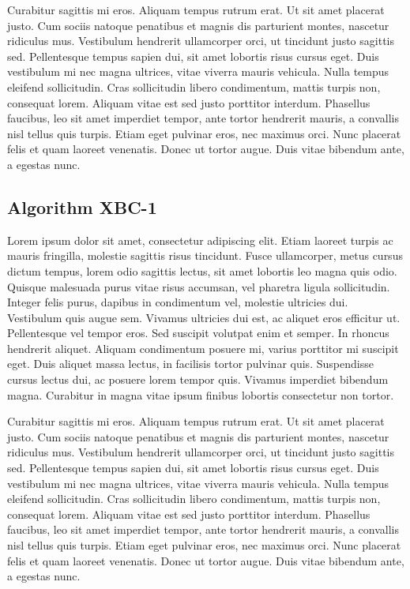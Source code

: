 \documentclass[conference]{IEEEtran}
\begin{document}
Curabitur sagittis mi eros. Aliquam tempus rutrum erat. Ut sit amet placerat justo. Cum sociis natoque penatibus et magnis dis parturient montes, nascetur ridiculus mus. Vestibulum hendrerit ullamcorper orci, ut tincidunt justo sagittis sed. Pellentesque tempus sapien dui, sit amet lobortis risus cursus eget. Duis vestibulum mi nec magna ultrices, vitae viverra mauris vehicula. Nulla tempus eleifend sollicitudin. Cras sollicitudin libero condimentum, mattis turpis non, consequat lorem. Aliquam vitae est sed justo porttitor interdum. Phasellus faucibus, leo sit amet imperdiet tempor, ante tortor hendrerit mauris, a convallis nisl tellus quis turpis. Etiam eget pulvinar eros, nec maximus orci. Nunc placerat felis et quam laoreet venenatis. Donec ut tortor augue. Duis vitae bibendum ante, a egestas nunc.

\subsection{Algorithm XBC-1}

Lorem ipsum dolor sit amet, consectetur adipiscing elit. Etiam laoreet turpis ac mauris fringilla, molestie sagittis risus tincidunt. Fusce ullamcorper, metus cursus dictum tempus, lorem odio sagittis lectus, sit amet lobortis leo magna quis odio. Quisque malesuada purus vitae risus accumsan, vel pharetra ligula sollicitudin. Integer felis purus, dapibus in condimentum vel, molestie ultricies dui. Vestibulum quis augue sem. Vivamus ultricies dui est, ac aliquet eros efficitur ut. Pellentesque vel tempor eros. Sed suscipit volutpat enim et semper. In rhoncus hendrerit aliquet. Aliquam condimentum posuere mi, varius porttitor mi suscipit eget. Duis aliquet massa lectus, in facilisis tortor pulvinar quis. Suspendisse cursus lectus dui, ac posuere lorem tempor quis. Vivamus imperdiet bibendum magna. Curabitur in magna vitae ipsum finibus lobortis consectetur non tortor.

Curabitur sagittis mi eros. Aliquam tempus rutrum erat. Ut sit amet placerat justo. Cum sociis natoque penatibus et magnis dis parturient montes, nascetur ridiculus mus. Vestibulum hendrerit ullamcorper orci, ut tincidunt justo sagittis sed. Pellentesque tempus sapien dui, sit amet lobortis risus cursus eget. Duis vestibulum mi nec magna ultrices, vitae viverra mauris vehicula. Nulla tempus eleifend sollicitudin. Cras sollicitudin libero condimentum, mattis turpis non, consequat lorem. Aliquam vitae est sed justo porttitor interdum. Phasellus faucibus, leo sit amet imperdiet tempor, ante tortor hendrerit mauris, a convallis nisl tellus quis turpis. Etiam eget pulvinar eros, nec maximus orci. Nunc placerat felis et quam laoreet venenatis. Donec ut tortor augue. Duis vitae bibendum ante, a egestas nunc.
\end{document}
